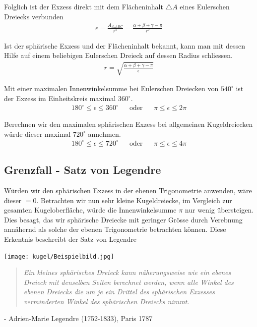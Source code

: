 \begin{refsection}
Folglich ist der Exzess direkt mit dem Flächeninhalt $\triangle A$ eines Eulerschen Dreiecks verbunden
\begin{align*}
\epsilon =\frac{A_{\triangle{ ABC }}}{r^2} = \frac{\alpha + \beta + \gamma - \pi}{r^2}
\end{align*}

Ist der sphärische Exzess und der Flächeninhalt bekannt, kann man mit dessen Hilfe auf einem beliebigen Eulerschen Dreieck auf dessen Radius schliessen.
\begin{align*}
r = \sqrt{\frac{\alpha + \beta + \gamma - \pi}{\epsilon}}
\end{align*}

Mit einer maximalen Innenwinkelsumme bei Eulerschen Dreiecken von $540^{\circ}$ ist der Exzess im Einheitskreis maximal $360^{\circ}$.
\[
\begin{aligned}
180^{\circ} \le \epsilon \le 360^{\circ}
&
&\text{oder}
&
&\pi \le \epsilon \le 2\pi
\end{aligned}
\]

Berechnen wir den maximalen sphärischen Exzess bei allgemeinen Kugeldreiecken würde dieser maximal $720^{\circ}$ annehmen.
\[
\begin{aligned}
180^{\circ} \le \epsilon \le 720^{\circ}
&
&\text{oder}
&
&\pi \le \epsilon \le 4\pi
\end{aligned}
\]



\subsection{Grenzfall - Satz von Legendre}
Würden wir den sphärischen Exzess in der ebenen Trigonometrie anwenden, wäre dieser $=0$. Betrachten wir nun sehr kleine Kugeldreiecke, im Vergleich zur gesamten Kugeloberfläche, würde die Innenwinkelsumme $\pi$ nur wenig übersteigen. Dies besagt, das wir sphärische Dreiecke mit geringer Grösse durch Verebnung annähernd als solche der ebenen Trigonometrie betrachten können. Diese Erkentnis beschreibt der Satz von Legendre

\begin{center}
        \texttt{[image: kugel/Beispielbild.jpg]}
\end{center}

\begin{quote} \textit{Ein kleines sphärisches Dreieck kann näherungsweise 
wie ein ebenes Dreieck mit denselben Seiten berechnet 
werden, wenn alle Winkel des ebenen Dreiecks die um 
je ein Drittel des sphärischen Exzesses verminderten 
Winkel des sphärischen Dreiecks nimmt.} \end{quote}
\begin{flushright} - Adrien-Marie Legendre (1752-1833), Paris 1787
\end{flushright}


\end{refsection}

